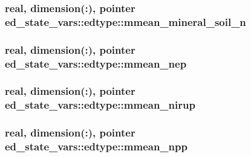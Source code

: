\subsubsection[{\texorpdfstring{mmean\+\_\+mineral\+\_\+soil\+\_\+n}{mmean_mineral_soil_n}}]{\setlength{\rightskip}{0pt plus 5cm}real, dimension(\+:), pointer ed\+\_\+state\+\_\+vars\+::edtype\+::mmean\+\_\+mineral\+\_\+soil\+\_\+n}\hypertarget{structed__state__vars_1_1edtype_ab6489e33da00f53491c75338795fc6c4}{}\label{structed__state__vars_1_1edtype_ab6489e33da00f53491c75338795fc6c4}
\subsubsection[{\texorpdfstring{mmean\+\_\+nep}{mmean_nep}}]{\setlength{\rightskip}{0pt plus 5cm}real, dimension(\+:), pointer ed\+\_\+state\+\_\+vars\+::edtype\+::mmean\+\_\+nep}\hypertarget{structed__state__vars_1_1edtype_aef7dbb51c8fb694d0da7bab813e04a12}{}\label{structed__state__vars_1_1edtype_aef7dbb51c8fb694d0da7bab813e04a12}
\subsubsection[{\texorpdfstring{mmean\+\_\+nirup}{mmean_nirup}}]{\setlength{\rightskip}{0pt plus 5cm}real, dimension(\+:), pointer ed\+\_\+state\+\_\+vars\+::edtype\+::mmean\+\_\+nirup}\hypertarget{structed__state__vars_1_1edtype_af2b79510251baddee94c5c1ba24a2388}{}\label{structed__state__vars_1_1edtype_af2b79510251baddee94c5c1ba24a2388}
\subsubsection[{\texorpdfstring{mmean\+\_\+npp}{mmean_npp}}]{\setlength{\rightskip}{0pt plus 5cm}real, dimension(\+:), pointer ed\+\_\+state\+\_\+vars\+::edtype\+::mmean\+\_\+npp}\hypertarget{structed__state__vars_1_1edtype_aa59fcc62e51f932f53ddf46dcb2e2aa6}{}\label{structed__state__vars_1_1edtype_aa59fcc62e51f932f53ddf46dcb2e2aa6}

